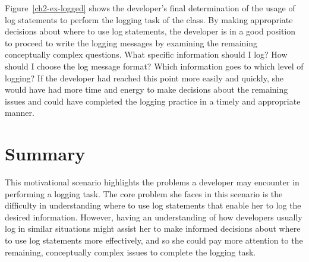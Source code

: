 Figure~\ref{ch2-ex-logged} shows the developer's final determination of the usage of log statements to perform the logging task of the  class. By making appropriate decisions about where to use log statements, the developer is in a good position to proceed to write the logging messages by examining the remaining conceptually complex questions. What specific information should I log? How should I choose the log message format? Which information goes to which level of logging? If the developer had reached this point more easily and quickly, she would have had more time and energy to make decisions about the remaining issues and could have completed the logging practice in a timely and appropriate manner.



\section{Summary}  \label{ch2-summary}

This motivational scenario highlights the problems a developer may encounter in performing a logging task. The core problem she faces in this scenario is the difficulty in understanding where to use log statements that enable her to log the desired information. However, having an understanding of how developers usually log in similar situations might assist her to make informed decisions about where to use log statements more effectively, and so she could pay more attention to the remaining, conceptually complex issues to complete the logging task.


